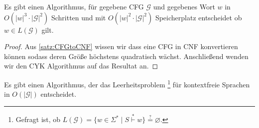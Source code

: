 \begin{Korollar}
	Es gibt einen Algorithmus, für gegebene \ac{CFG} $\mathcal{G}$ und gegebenes Wort $w$
	in $O(|w|^3\cdot |\mathcal{G}|^2)$ Schritten und mit $O(|w|^2\cdot |\mathcal{G}|^2)$ Speicherplatz
	entscheidet ob $w\in L(\mathcal{G})$ gilt.
\end{Korollar}

\begin{proof}
	Aus \autoref{satz:CFGtoCNF} wissen wir dass eine \ac{CFG} in \ac{CNF} 
	konvertieren können sodass deren Größe höchstens quadratisch wächst.
	Anschließend wenden wir den CYK Algorithmus auf das Resultat an.
\end{proof}


\begin{Satz}[name={[Entscheidbarkeit des Leerheitsproblems für kontextfreie Sprachen]}]
  \label{thm:cfl-decidable-emptyness}
    Es gibt einen Algorithmus, der das Leerheitsproblem%
    \footnote{Gefragt ist, ob $L(\mathcal{G}) = \{ w\in\Sigma^* \mid S\overset{*}{\vdash} w \} \overset{?}{=} \varnothing$.}
    für kontextfreie Sprachen in $O(|\mathcal{G}|)$ entscheidet.
\end{Satz}

